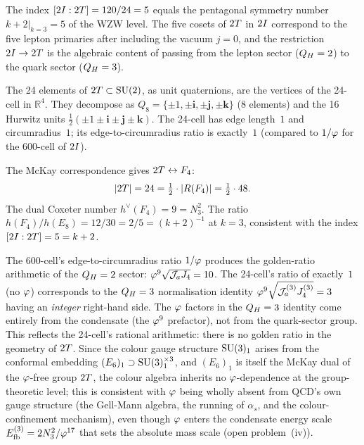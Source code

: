 \begin{remark}
\label{P15:rem:index_and_structure}
The index $[2I:2T]=120/24=5$ equals the pentagonal
symmetry number $k+2\big|_{k=3}=5$ of the WZW level.
The five cosets of $2T$ in $2I$
correspond to the five lepton primaries after including the
vacuum $j=0$, and the restriction $2I\to2T$ is the algebraic
content of passing from the lepton sector ($Q_H=2$) to the
quark sector ($Q_H=3$).
\end{remark}

\begin{proposition}
\label{P15:prop:24cell}
The 24 elements of $2T\subset\mathrm{SU}(2)$, as unit quaternions,
are the vertices of the 24-cell in $\mathbb{R}^4$.
They decompose as $Q_8 = \{\pm1,\pm\mathbf{i},\pm\mathbf{j},\pm\mathbf{k}\}$
(8 elements) and the 16 Hurwitz units
$\tfrac{1}{2}(\pm1\pm\mathbf{i}\pm\mathbf{j}\pm\mathbf{k})$.
The 24-cell has edge length~$1$ and circumradius~$1$;
its edge-to-circumradius ratio is exactly~$1$
(compared to $1/\varphi$ for the 600-cell of $2I$).
\end{proposition}

\begin{remark}
\label{P15:rem:F4}
The McKay correspondence gives $2T\leftrightarrow F_4$:
\begin{equation}
  |2T|=24 = \tfrac12\cdot|R(F_4)|=\tfrac12\cdot48.
  \label{P15:eq:2T_F4}
\end{equation}
The dual Coxeter number $h^\vee(F_4)=9=N_3^2$.
The ratio $h(F_4)/h(E_8)=12/30=2/5=(k+2)^{-1}$ at $k=3$, consistent
with the index $[2I:2T]=5=k+2$.
\end{remark}

\begin{remark}
\label{P15:rem:integer_norm_24cell}
The 600-cell's edge-to-circumradius ratio $1/\varphi$ produces the
golden-ratio arithmetic of the $Q_H=2$ sector: $\varphi^9\sqrt{\mathcal{J}_a J_4}=10$.
The 24-cell's ratio of exactly~$1$ (no $\varphi$) corresponds to the
$Q_H=3$ normalisation identity $\varphi^9\sqrt{\mathcal{J}_a^{(3)}J_4^{(3)}}=3$
having an \emph{integer} right-hand side.
The $\varphi$ factors in the $Q_H=3$ identity come entirely from the
condensate (the $\varphi^9$ prefactor), not from the quark-sector group.
This reflects the 24-cell's rational arithmetic: there is no
golden ratio in the geometry of $2T$.
Since the colour gauge structure $\mathrm{SU}(3)_1$ arises from the conformal
embedding $(E_6)_1\supset\mathrm{SU}(3)_1^{\times3}$,
and $(E_6)_1$ is itself the McKay dual of the $\varphi$-free group $2T$,
the colour algebra inherits no $\varphi$-dependence at the group-theoretic
level; this is consistent with $\varphi$ being wholly absent from QCD's
own gauge structure (the Gell-Mann algebra, the running of $\alpha_s$,
and the colour-confinement mechanism), even though $\varphi$ enters the
condensate energy scale $E_{\mathrm{fb}}^{(3)}=2N_3^2/\varphi^{17}$ that sets the
absolute mass scale (open problem~(iv)).
\end{remark}

